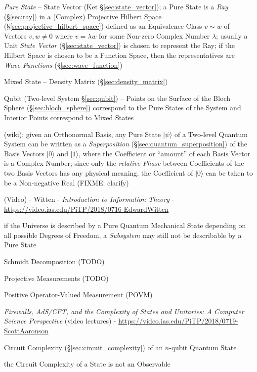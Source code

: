 \emph{Pure State} -- State Vector (Ket \S\ref{sec:state_vector}); a Pure State
is a \emph{Ray} (\S\ref{sec:ray}) in a (Complex) Projective Hilbert Space
(\S\ref{sec:projective_hilbert_space}) defined as an Equivalence Class $v \sim
w$ of Vectors $v, w \neq 0$ where $v = \lambda w$ for some Non-zero Complex
Number $\lambda$; usually a Unit \emph{State Vector} (\S\ref{sec:state_vector})
is chosen to represent the Ray; if the Hilbert Space is chosen to be a Function
Space, then the representatives are \emph{Wave Functions}
(\S\ref{sec:wave_function})

Mixed State -- Density Matrix (\S\ref{sec:density_matrix})

Qubit (Two-level System \S\ref{sec:qubit}) -- Points on the Surface of the Bloch
Sphere (\S\ref{sec:bloch_sphere}) correspond to the Pure States of the System
and Interior Points correspond to Mixed States

(wiki): given an Orthonormal Basis, any Pure State $|\psi\rangle$ of a Two-level
Quantum System can be written as a \emph{Superposition}
(\S\ref{sec:quantum_superposition}) of the Basis Vectors $|0\rangle$ and
$|1\rangle$, where the Coefficient or ``amount'' of each Basis Vector is a
Complex Number; since only the \emph{relative Phase} between Coefficients of the
two Basis Vectors has any physical meaning, the Coefficient of $|0\rangle$ can
be taken to be a Non-negative Real (FIXME: clarify)

\asterism

(Video) - Witten - \emph{Introduction to Information Theory} -
\url{https://video.ias.edu/PiTP/2018/0716-EdwardWitten}

if the Universe is described by a Pure Quantum Mechanical State depending on all
possible Degrees of Freedom, a \emph{Subsystem} may still not be describable by
a Pure State

Schmidt Decomposition (TODO)

Projective Measurements (TODO)

Positive Operator-Valued Measurement (POVM)

\emph{Firewalls, AdS/CFT, and the Complexity of States and Unitaries: A Computer
  Science Perspective}
(video lectures)
-
\url{https://video.ias.edu/PiTP/2018/0719-ScottAaronson}

Circuit Complexity (\S\ref{sec:circuit_complexity}) of an $n$-qubit Quantum
State

the Circuit Complexity of a State is not an Observable



